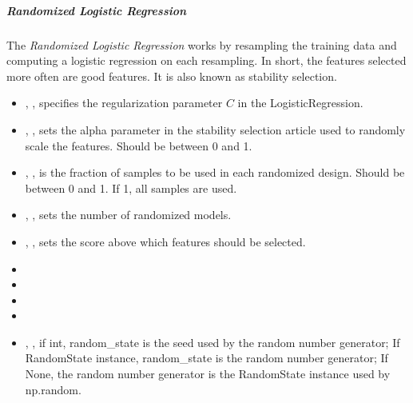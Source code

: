 \subparagraph{Randomized Logistic Regression}
\mbox{}

The \textit{Randomized Logistic Regression} works by resampling the training
data and computing a logistic regression on each resampling.
%
In short, the features selected more often are good features.
%
It is also known as stability selection.
%
\begin{itemize}
  \item {}, , specifies the
  regularization parameter $C$ in the LogisticRegression.
  \item {}, , sets
  the alpha parameter in the stability selection article used to randomly scale
  the features. 
  Should be between 0 and 1.
  \item {}, , is the
  fraction of samples to be used in each randomized design.
  Should be between 0 and 1.
  If 1, all samples are used.
  \item {}, , sets the number
  of randomized models.
  \item {}, , sets
  the score above which features should be selected.
  \item {}
  \item \verDescriptionB
  \item {}
  \item \tolDescriptionC{}
  \item {}, , if int, random\_state is the seed used by the random number
  generator; If RandomState instance, random\_state is the random
  number generator; If None, the random number generator is the RandomState
  instance used by np.random.
\end{itemize}

